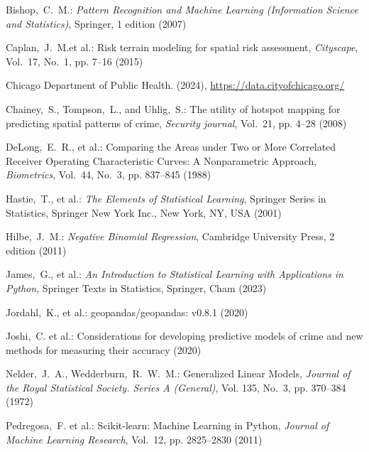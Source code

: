 \begin{thebibliography}{}

  Bishop,~C.~M.: {\em Pattern Recognition and Machine Learning (Information Science and Statistics)}, Springer, 1 edition (2007)
  
  Caplan,~J.~M.et al.: Risk terrain modeling for spatial risk assessment, {\em Cityscape}, Vol.~17, No.~1, pp. 7--16 (2015)
  
  Chicago Department of Public Health. (2024), \url{https://data.cityofchicago.org/}
  
  Chainey,~S., Tompson,~L., and Uhlig,~S.: The utility of hotspot mapping for predicting spatial patterns of crime, {\em Security journal}, Vol.~21, pp. 4--28 (2008)
  
  DeLong,~E.~R., et al.: Comparing the Areas under Two or More Correlated Receiver Operating Characteristic Curves: A Nonparametric Approach, {\em Biometrics}, Vol.~44, No.~3, pp. 837--845 (1988)
  
  Hastie,~T., et al.: {\em The Elements of Statistical Learning}, Springer Series in Statistics, Springer New York Inc., New York, NY, USA (2001)
  
  Hilbe,~J.~M.: {\em Negative Binomial Regression}, Cambridge University Press, 2 edition (2011)
  
  James,~G., et al.: {\em An Introduction to Statistical Learning with Applications in Python}, Springer Texts in Statistics, Springer, Cham (2023)
  
  Jordahl,~K., et al.: geopandas/geopandas: v0.8.1 (2020)
  
  Joshi,~C. et al.: Considerations for developing predictive models of crime and new methods for measuring their accuracy (2020)
  
  Nelder,~J.~A., Wedderburn,~R.~W.~M.: Generalized Linear Models, {\em Journal of the Royal Statistical Society. Series A (General)}, Vol. 135, No.~3, pp. 370--384 (1972)
  
  Pedregosa,~F. et al.: Scikit-learn: Machine Learning in {P}ython, {\em Journal of Machine Learning Research}, Vol.~12, pp. 2825--2830 (2011)
  

\end{thebibliography}
